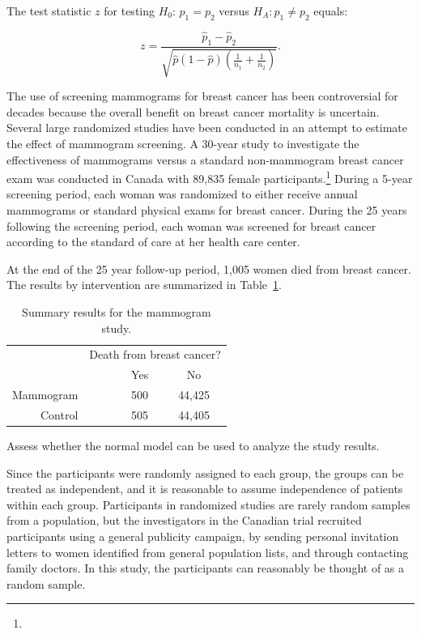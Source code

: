 The test statistic $z$ for testing $H_0:\, p_1 = p_2$ versus $H_A: p_1 \neq p_2$ equals:

\[z = \dfrac{\hat{p}_1 - \hat{p}_2}{\sqrt{\hat{p}(1-\hat{p})\left(\frac{1}{n_1} + \frac{1}{n_2} \right)}}. \]
 

\begin{example}{The use of screening mammograms for breast cancer has been controversial for decades because the overall benefit on breast cancer mortality is uncertain.  Several large randomized studies have been conducted in an attempt to estimate the effect of mammogram screening. A 30-year study to investigate the effectiveness of mammograms versus a standard non-mammogram breast cancer exam was conducted in Canada with 89,835 female participants.\footnote{} During a 5-year screening period, each woman was randomized to either receive annual mammograms or standard physical exams for breast cancer.  During the 25 years following the screening period, each woman was screened for breast cancer according to the standard of care at her health care center. 

At the end of the 25 year follow-up period, 1,005 women died from breast cancer. The results by intervention are summarized in Table~\ref{mammogramStudySummaryTable}.
		
\begin{table}[h]
	\centering
	\begin{tabular}{rrcc}
		& \multicolumn{3}{c}{Death from breast cancer?} \\
		\cline{2-4}
		& \ \hspace{3mm}\ & Yes & No \\
		\hline
		Mammogram && 500 & 44,425 \\
		Control && 505 & 44,405 \\
		\hline
	\end{tabular}
	\caption{Summary results for the mammogram study.}
	\label{mammogramStudySummaryTable}
\end{table}

Assess whether the normal model can be used to analyze the study results.}

Since the participants were randomly assigned to each group, the groups can be treated as independent, and it is reasonable to assume independence of patients within each group.  Participants in randomized studies are rarely random samples from a population, but the investigators in the Canadian trial recruited  participants using a general publicity campaign, by sending personal invitation letters to women identified from general population lists, and through contacting family doctors.  In this study, the participants can reasonably be thought of as a random sample.



\end{example}
